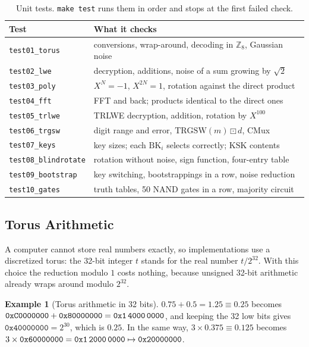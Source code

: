 \documentclass[12pt]{article}
\theoremstyle{plain}
\theoremstyle{definition}
\newtheorem{example}{Example}
\newcommand{\Z}{\mathbb{Z}}
\newcommand{\BK}{\mathrm{BK}}
\newcommand{\KSK}{\mathrm{KSK}}
\newcommand{\ext}{\boxdot}
\newcommand{\code}[1]{\texttt{#1}}
\begin{document}
\begin{table}[!htb]
\centering
\caption{Unit tests. \code{make test} runs them in order and stops at the first
failed check.}
\label{tab:tests}
\small
\begin{tabular}{@{}ll@{}}
\toprule
Test & What it checks\\
\midrule
\code{test01\_torus} & conversions, wrap-around, decoding in $\Z_8$, Gaussian noise\\
\code{test02\_lwe} & decryption, additions, noise of a sum growing by $\sqrt2$\\
\code{test03\_poly} & $X^N=-1$, $X^{2N}=1$, rotation against the direct product\\
\code{test04\_fft} & FFT and back; products identical to the direct ones\\
\code{test05\_trlwe} & TRLWE decryption, addition, rotation by $X^{100}$\\
\code{test06\_trgsw} & digit range and error, $\mathrm{TRGSW}(m)\ext d$, CMux\\
\code{test07\_keys} & key sizes; each $\BK_i$ selects correctly; $\KSK$ contents\\
\code{test08\_blindrotate} & rotation without noise, sign function, four-entry table\\
\code{test09\_bootstrap} & key switching, bootstrappings in a row, noise reduction\\
\code{test10\_gates} & truth tables, 50 NAND gates in a row, majority circuit\\
\bottomrule
\end{tabular}
\end{table}

\subsection{Torus Arithmetic}
\label{sec:torusimpl}

A computer cannot store real numbers exactly, so implementations use a
discretized torus: the 32-bit integer $t$ stands for the real number
$t/2^{32}$. With this choice the reduction modulo $1$ costs nothing, because
unsigned 32-bit arithmetic already wraps around modulo $2^{32}$.

\begin{example}[Torus arithmetic in 32 bits]
$0.75+0.5=1.25\equiv0.25$ becomes
$\texttt{0xC0000000}+\texttt{0x80000000}=\texttt{0x1\,4000\,0000}$, and keeping
the 32 low bits gives $\texttt{0x40000000}=2^{30}$, which is $0.25$. In the same
way, $3\times0.375\equiv0.125$ becomes
$3\times\texttt{0x60000000}=\texttt{0x1\,2000\,0000}\mapsto\texttt{0x20000000}$.
\end{example}
\end{document}

